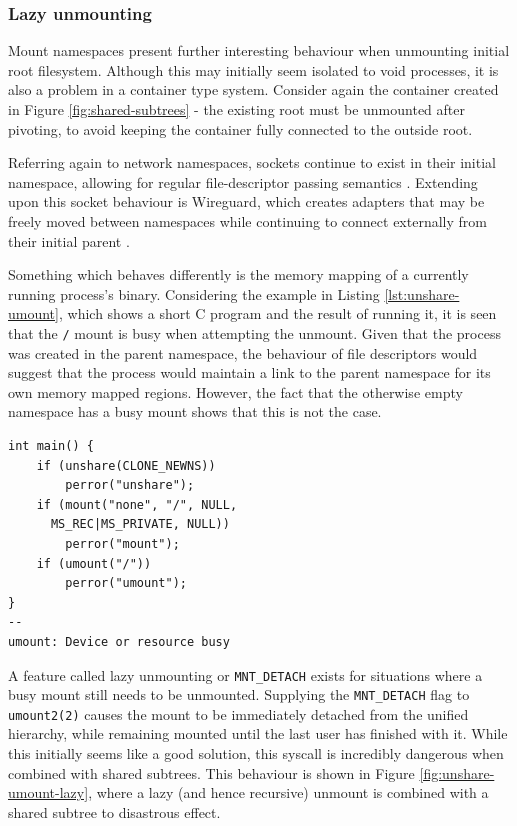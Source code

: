 \documentclass[sigplan]{acmart}
\begin{document}
\subsubsection{Lazy unmounting}

Mount namespaces present further interesting behaviour when unmounting initial root filesystem. Although this may initially seem isolated to void processes, it is also a problem in a container type system. Consider again the container created in Figure \ref{fig:shared-subtrees} - the existing root must be unmounted after pivoting, to avoid keeping the container fully connected to the outside root.

Referring again to network namespaces, sockets continue to exist in their initial namespace, allowing for regular file-descriptor passing semantics \citep{biederman_re_2007}. Extending upon this socket behaviour is Wireguard, which creates adapters that may be freely moved between namespaces while continuing to connect externally from their initial parent \citep[§7.3]{donenfeld_wireguard_2017}.

Something which behaves differently is the memory mapping of a currently running process's binary. Considering the example in Listing \ref{lst:unshare-umount}, which shows a short C program and the result of running it, it is seen that the \texttt{/} mount is busy when attempting the unmount. Given that the process was created in the parent namespace, the behaviour of file descriptors would suggest that the process would maintain a link to the parent namespace for its own memory mapped regions. However, the fact that the otherwise empty namespace has a busy mount shows that this is not the case.

\begin{lstlisting}[float,label={lst:unshare-umount}]
int main() {
	if (unshare(CLONE_NEWNS))
		perror("unshare");
	if (mount("none", "/", NULL,
	  MS_REC|MS_PRIVATE, NULL))
		perror("mount");
	if (umount("/"))
		perror("umount");
}
--
umount: Device or resource busy
\end{lstlisting}

A feature called lazy unmounting or \texttt{MNT\_DETACH} exists for situations where a busy mount still needs to be unmounted. Supplying the \texttt{MNT\_DETACH} flag to \texttt{umount2(2)} causes the mount to be immediately detached from the unified hierarchy, while remaining mounted until the last user has finished with it. While this initially seems like a good solution, this syscall is incredibly dangerous when combined with shared subtrees. This behaviour is shown in Figure \ref{fig:unshare-umount-lazy}, where a lazy (and hence recursive) unmount is combined with a shared subtree to disastrous effect.
\end{document}
